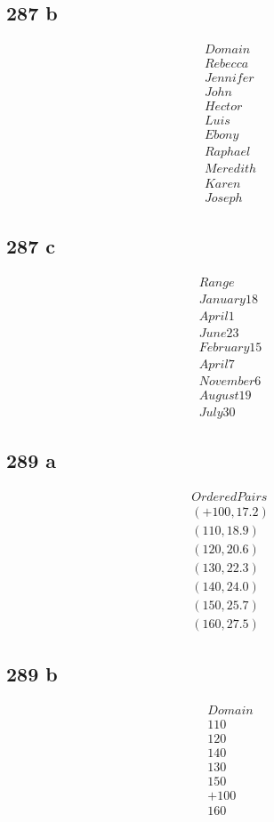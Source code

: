 \documentclass{article}
\begin{document}
    \subsection*{287 b}
    \begin{align*}
        Domain \\
        Rebecca \\
        Jennifer \\
        John \\
        Hector \\
        Luis \\
        Ebony \\
        Raphael \\
        Meredith \\
        Karen \\
        Joseph
    \end{align*}

    \subsection*{287 c}
    \begin{align*}
        Range \\
        January 18 \\
        April 1 \\
        June 23 \\
        February 15 \\
        April 7 \\
        November 6 \\
        August 19 \\
        July 30
    \end{align*}

    \subsection*{289 a}
    \begin{align*}
        Ordered Pairs \\
        (+100, 17.2)\\
        (110, 18.9)\\
        (120, 20.6)\\
        (130, 22.3)\\
        (140, 24.0)\\
        (150, 25.7)\\
        (160, 27.5)
    \end{align*}

    \subsection*{289 b}
    \begin{align*}
        Domain \\
        110 \\
        120 \\
        140 \\
        130 \\
        150 \\
        +100 \\
        160
    \end{align*}
\end{document}
